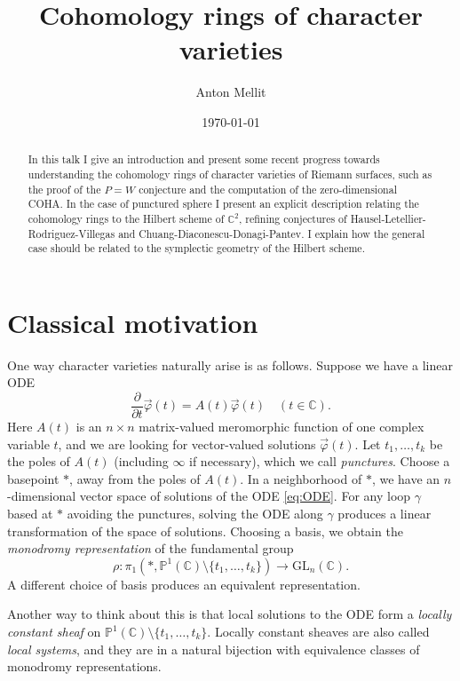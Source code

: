 \documentclass[12pt]{amsart}
\title{Cohomology rings of character varieties}
\author{Anton Mellit}
\date{\today}
\theoremstyle{definition}
\theoremstyle{remark}
\numberwithin{equation}{section}
\newcommand{\BC}{\mathbb C}
\begin{document}
	\onehalfspacing
	
	\begin{abstract}
		In this talk I give an introduction and present some recent progress towards understanding the cohomology rings of character varieties of Riemann surfaces, such as the proof of the $P=W$ conjecture and the computation of the zero-dimensional COHA. In the case of punctured sphere I present an explicit description relating the cohomology rings to the Hilbert scheme of $\BC^2$, refining conjectures of Hausel-Letellier-Rodriguez-Villegas and Chuang-Diaconescu-Donagi-Pantev. I explain how the general case should be related to the symplectic geometry of the Hilbert scheme.
	\end{abstract}
	
	\maketitle
	
	
	\section{Classical motivation}
	One way character varieties naturally arise is as follows. Suppose we have a linear ODE
	\begin{equation}\label{eq:ODE}
		\frac\partial{\partial t} \vec{\varphi}(t) = A(t) \vec{\varphi}(t)\quad(t\in \mathbb{C}).
	\end{equation}
	Here $A(t)$ is an $n\times n$ matrix-valued meromorphic function of one complex variable $t$, and we are looking for vector-valued solutions $\vec{\varphi}(t)$. Let $t_1,\ldots, t_k$ be the poles of $A(t)$ (including $\infty$ if necessary), which we call \emph{punctures}. Choose a basepoint $\ast$, away from the poles of $A(t)$. In a neighborhood of $\ast$, we have an $n$-dimensional vector space of solutions of the ODE \eqref{eq:ODE}. For any loop $\gamma$ based at $\ast$ avoiding the punctures, solving the ODE along $\gamma$ produces a linear transformation of the space of solutions. Choosing a basis, we obtain the \emph{monodromy representation} of the fundamental group
	\[
	\rho:\pi_1(*, \mathbb{P}^1(\mathbb{C})\setminus\{t_1,\ldots,t_k\}) \to \mathrm{GL}_n(\mathbb{C}).
	\] 
	A different choice of basis produces an equivalent representation.
	
	Another way to think about this is that local solutions to the ODE form a \emph{locally constant sheaf} on $\mathbb{P}^1(\mathbb{C})\setminus\{t_1,\ldots,t_k\}$. Locally constant sheaves are also called \emph{local systems}, and they are in a natural bijection with equivalence classes of monodromy representations.
	
\end{document}
